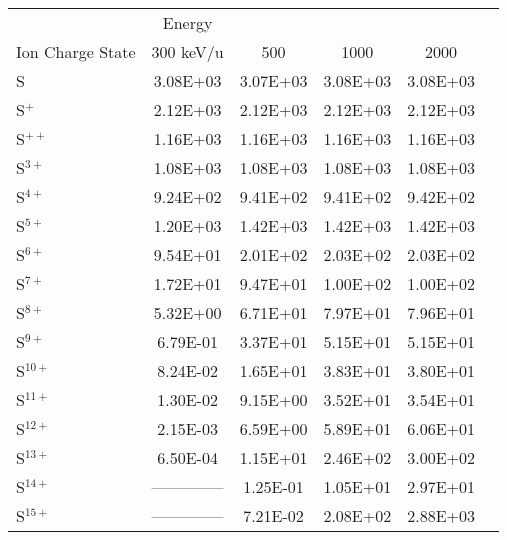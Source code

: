 \begin{table}[ht]
\begin{tabular}{l|c|c|c|c|c}
    \hline
    \hline
    & Energy & & & & \\
    Ion Charge State & 300 keV/u & 500 & 1000 & 2000 & \\
    \hline
    S         & 3.08E+03 & 3.07E+03 & 3.08E+03 & 3.08E+03 & \\
    S$^+$     & 2.12E+03 & 2.12E+03 & 2.12E+03 & 2.12E+03 & \\
    S$^{ ++}$ & 1.16E+03 & 1.16E+03 & 1.16E+03 & 1.16E+03 & \\
    S$^{ 3+}$ & 1.08E+03 & 1.08E+03 & 1.08E+03 & 1.08E+03 & \\
    S$^{ 4+}$ & 9.24E+02 & 9.41E+02 & 9.41E+02 & 9.42E+02 & \\
    S$^{ 5+}$ & 1.20E+03 & 1.42E+03 & 1.42E+03 & 1.42E+03 & \\
    S$^{ 6+}$ & 9.54E+01 & 2.01E+02 & 2.03E+02 & 2.03E+02 & \\
    S$^{ 7+}$ & 1.72E+01 & 9.47E+01 & 1.00E+02 & 1.00E+02 & \\
    S$^{ 8+}$ & 5.32E+00 & 6.71E+01 & 7.97E+01 & 7.96E+01 & \\
    S$^{ 9+}$ & 6.79E-01 & 3.37E+01 & 5.15E+01 & 5.15E+01 & \\
    S$^{10+}$ & 8.24E-02 & 1.65E+01 & 3.83E+01 & 3.80E+01 & \\
    S$^{11+}$ & 1.30E-02 & 9.15E+00 & 3.52E+01 & 3.54E+01 & \\
    S$^{12+}$ & 2.15E-03 & 6.59E+00 & 5.89E+01 & 6.06E+01 & \\
    S$^{13+}$ & 6.50E-04 & 1.15E+01 & 2.46E+02 & 3.00E+02 & \\
    S$^{14+}$ & -------------- & 1.25E-01 & 1.05E+01 & 2.97E+01 & \\
    S$^{15+}$ & -------------- & 7.21E-02 & 2.08E+02 & 2.88E+03 & \\
    \hline
    \end{tabular}
    \label{tab:SulDEProd}
\end{table}

